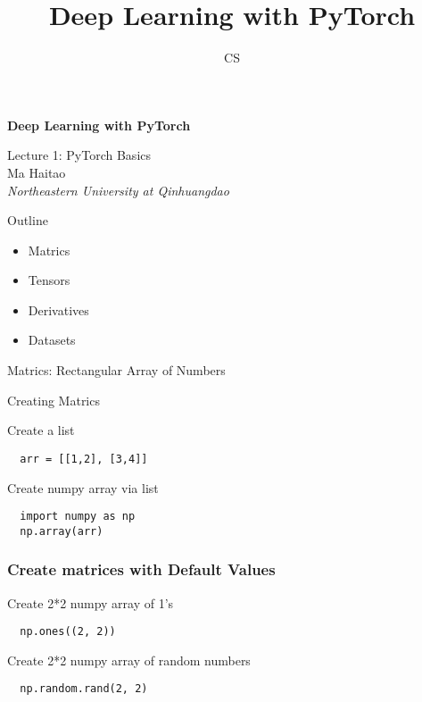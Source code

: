 \documentclass[14 pt]{beamer}
\author[mht]{CS}
\title[Deep Learning with PyTorch]{Deep Learning with PyTorch}
\institute{Northeastern University at Qinhuangdao}
\let\olditem\item
\renewcommand{\item}{\olditem\vspace{4pt}}
\newcommand{\comment}[1]{\textcolor{comment}{\footnotesize{#1}\normalsize}} %
\newcommand{\Comment}[1]{\textcolor{Comment}{\footnotesize{#1}\normalsize}} %
\newcommand{\COMMENT}[1]{\textcolor{COMMENT}{\footnotesize{#1}\normalsize}} %
\begin{document}
\begin{frame}[c]
\begin{center}
	\textcolor{normal text.fg!50!Comment}{\textbf{\Large{Deep Learning with PyTorch}}}
	\vspace{4em}

    \COMMENT{\large{Lecture 1: PyTorch Basics}} \\
\vspace{4em}
    \Comment{{Ma Haitao}} \\
\comment{\textit{Northeastern University at Qinhuangdao}}\\
\end{center}
\end{frame}

\begin{frame}{Outline}
  \begin{itemize}
  \item Matrics
  \item Tensors
  \item Derivatives
  \item Datasets 
\end{itemize}
\end{frame}

\begin{frame}
\begin{center}
\Large{Matrics: Rectangular Array of Numbers}
\end{center}
\end{frame}

\begin{frame}[fragile]{Creating Matrics}
  \begin{block}{Create a list}
\begin{verbatim}
  arr = [[1,2], [3,4]] 
\end{verbatim}
  \end{block}
  \begin{block}{Create numpy array via list}
\begin{verbatim}
  import numpy as np
  np.array(arr) 
\end{verbatim}
  \end{block}
\end{frame}

\begin{frame}[fragile]
  \frametitle{Create matrices with Default Values}
  \begin{block}{Create 2*2 numpy array of 1's}
\begin{verbatim}
  np.ones((2, 2))
\end{verbatim}
  \end{block}
  \begin{block}{Create 2*2 numpy array of random numbers}
\begin{verbatim}
  np.random.rand(2, 2)
\end{verbatim}
  \end{block}
\end{frame}
\end{document}
